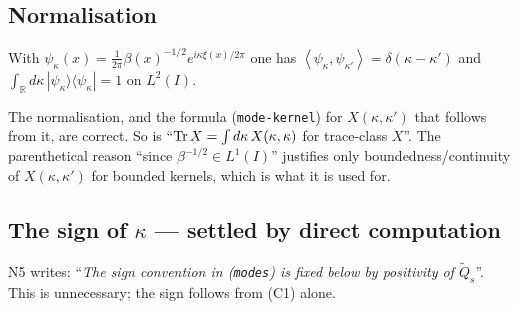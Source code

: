 \documentclass[11pt]{article}
\newcommand{\ip}[2]{\left\langle #1,#2\right\rangle}
\begin{document}
\subsection{Normalisation}
\begin{lemma}
With $\psi_\kappa(x)=\tfrac1{2\pi}\beta(x)^{-1/2}e^{i\kappa\xi(x)/2\pi}$ one has
$\ip{\psi_\kappa}{\psi_{\kappa'}}=\delta(\kappa-\kappa')$ and
$\int_{\mathbb R}d\kappa\,|\psi_\kappa\rangle\langle\psi_\kappa|=1$ on $L^2(I)$.
\end{lemma}
\lstep{1}{2}{$\ip{\Psi_\kappa}{\Psi_{\kappa'}}=\tfrac1{4\pi^2}\int e^{i(\kappa'-\kappa)\xi/2\pi}d\xi
=\tfrac1{4\pi^2}\cdot2\pi\,\delta\bigl(\tfrac{\kappa'-\kappa}{2\pi}\bigr)=\delta(\kappa-\kappa')$.}
\begin{verdictok}The normalisation, and the formula (\texttt{mode-kernel}) for
$X(\kappa,\kappa')$ that follows from it, are correct.  So is
``$\operatorname{Tr} X=\int d\kappa\,X(\kappa,\kappa)$ for trace-class $X$''.  The parenthetical reason
``since $\beta^{-1/2}\in L^1(I)$'' justifies only boundedness/continuity of $X(\kappa,\kappa')$
for bounded kernels, which is what it is used for.\end{verdictok}

\subsection{The sign of $\kappa$ --- settled by direct computation}
N5 writes: ``\emph{The sign convention in \textup{(\texttt{modes})} is fixed below by positivity of
$\widetilde Q_s$}''.  This is unnecessary; the sign follows from (C1) alone.
\end{document}
